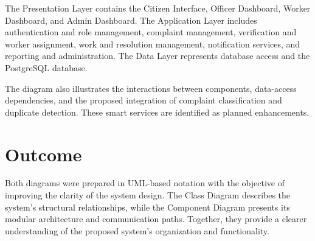 \documentclass[12pt,a4paper]{article}
\begin{document}
The Presentation Layer contains the Citizen Interface, Officer Dashboard, Worker Dashboard, and Admin Dashboard. The Application Layer includes authentication and role management, complaint management, verification and worker assignment, work and resolution management, notification services, and reporting and administration. The Data Layer represents database access and the PostgreSQL database.

The diagram also illustrates the interactions between components, data-access dependencies, and the proposed integration of complaint classification and duplicate detection. These smart services are identified as planned enhancements.

\section*{Outcome}

Both diagrams were prepared in UML-based notation with the objective of improving the clarity of the system design. The Class Diagram describes the system's structural relationships, while the Component Diagram presents its modular architecture and communication paths. Together, they provide a clearer understanding of the proposed system's organization and functionality.
\end{document}
